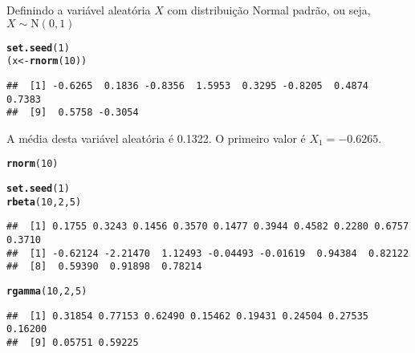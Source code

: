\documentclass{article}\usepackage[]{graphicx}\usepackage[]{color}
\makeatletter
\newcommand{\hlnum}[1]{\textcolor[rgb]{0.686,0.059,0.569}{#1}}%
\newcommand{\hlstd}[1]{\textcolor[rgb]{0.345,0.345,0.345}{#1}}%
\newcommand{\hlkwb}[1]{\textcolor[rgb]{0.69,0.353,0.396}{#1}}%
\newcommand{\hlkwd}[1]{\textcolor[rgb]{0.737,0.353,0.396}{\textbf{#1}}}%
\newenvironment{kframe}{%
 \def\at@end@of@kframe{}%
 \ifinner\ifhmode%
  \def\at@end@of@kframe{\end{minipage}}%
  \begin{minipage}{\columnwidth}%
 \fi\fi%
 \def\FrameCommand##1{\hskip\@totalleftmargin \hskip-\fboxsep
 \colorbox{shadecolor}{##1}\hskip-\fboxsep
     \hskip-\linewidth \hskip-\@totalleftmargin \hskip\columnwidth}%
 \MakeFramed {\advance\hsize-\width
   \@totalleftmargin\z@ \linewidth\hsize
   \@setminipage}}%
 {\par\unskip\endMakeFramed%
 \at@end@of@kframe}
\newenvironment{knitrout}{}{} %
\makeatother
\begin{document}
Definindo a variável aleatória $X$ com distribuição Normal padrão, ou
seja, $X \sim \textrm{N}(0,1)$
\begin{knitrout}
\color{fgcolor}\begin{kframe}
\begin{alltt}
\hlkwd{set.seed}\hlstd{(}\hlnum{1}\hlstd{)}
\hlstd{(x} \hlkwb{<-} \hlkwd{rnorm}\hlstd{(}\hlnum{10}\hlstd{))}
\end{alltt}
\begin{verbatim}
##  [1] -0.6265  0.1836 -0.8356  1.5953  0.3295 -0.8205  0.4874  0.7383
##  [9]  0.5758 -0.3054
\end{verbatim}
\end{kframe}
\end{knitrout}

A média desta variável aleatória é 0.1322. O primeiro valor é
$X_1 = -0.6265$.

\begin{knitrout}
\color{fgcolor}\begin{kframe}
\begin{alltt}
\hlkwd{rnorm}\hlstd{(}\hlnum{10}\hlstd{)}
\end{alltt}
\end{kframe}
\end{knitrout}


\begin{knitrout}
\color{fgcolor}\begin{kframe}
\begin{alltt}
\hlkwd{set.seed}\hlstd{(}\hlnum{1}\hlstd{)}
\hlkwd{rbeta}\hlstd{(}\hlnum{10}\hlstd{,} \hlnum{2}\hlstd{,} \hlnum{5}\hlstd{)}
\end{alltt}
\begin{verbatim}
##  [1] 0.1755 0.3243 0.1456 0.3570 0.1477 0.3944 0.4582 0.2280 0.6757 0.3710
##  [1] -0.62124 -2.21470  1.12493 -0.04493 -0.01619  0.94384  0.82122
##  [8]  0.59390  0.91898  0.78214
\end{verbatim}
\begin{alltt}
\hlkwd{rgamma}\hlstd{(}\hlnum{10}\hlstd{,} \hlnum{2}\hlstd{,} \hlnum{5}\hlstd{)}
\end{alltt}
\begin{verbatim}
##  [1] 0.31854 0.77153 0.62490 0.15462 0.19431 0.24504 0.27535 0.16200
##  [9] 0.05751 0.59225
\end{verbatim}
\end{kframe}
\end{knitrout}
\end{document}
